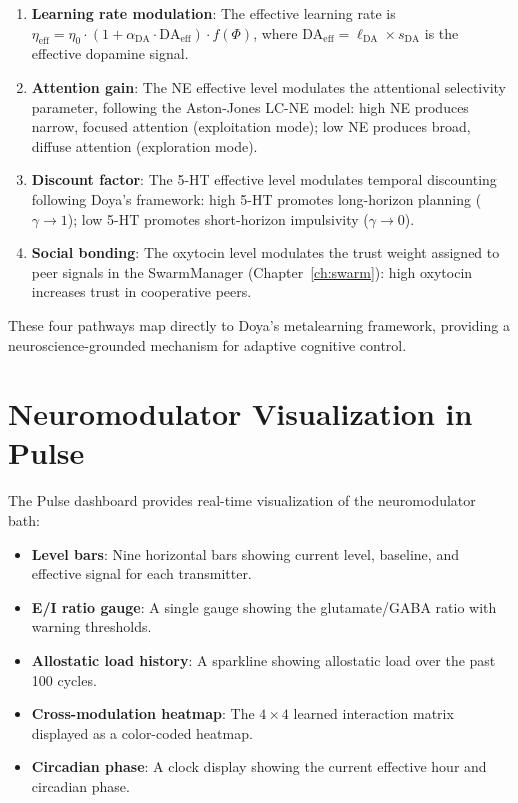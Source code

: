 \documentclass[12pt]{book}
\begin{document}
\begin{enumerate}
  \item \textbf{Learning rate modulation}: The effective learning rate is $\eta_{\text{eff}} = \eta_0 \cdot (1 + \alpha_{\text{DA}} \cdot \text{DA}_{\text{eff}}) \cdot f(\Phi)$, where $\text{DA}_{\text{eff}} = \ell_{\text{DA}} \times s_{\text{DA}}$ is the effective dopamine signal.
  \item \textbf{Attention gain}: The NE effective level modulates the attentional selectivity parameter, following the Aston-Jones LC-NE model: high NE produces narrow, focused attention (exploitation mode); low NE produces broad, diffuse attention (exploration mode).
  \item \textbf{Discount factor}: The 5-HT effective level modulates temporal discounting following Doya's framework: high 5-HT promotes long-horizon planning ($\gamma \to 1$); low 5-HT promotes short-horizon impulsivity ($\gamma \to 0$).
  \item \textbf{Social bonding}: The oxytocin level modulates the trust weight assigned to peer signals in the SwarmManager (Chapter~\ref{ch:swarm}): high oxytocin increases trust in cooperative peers.
\end{enumerate}

These four pathways map directly to Doya's metalearning framework, providing a neuroscience-grounded mechanism for adaptive cognitive control.

\section{Neuromodulator Visualization in Pulse}

The Pulse dashboard provides real-time visualization of the neuromodulator bath:

\begin{itemize}
  \item \textbf{Level bars}: Nine horizontal bars showing current level, baseline, and effective signal for each transmitter.
  \item \textbf{E/I ratio gauge}: A single gauge showing the glutamate/GABA ratio with warning thresholds.
  \item \textbf{Allostatic load history}: A sparkline showing allostatic load over the past 100 cycles.
  \item \textbf{Cross-modulation heatmap}: The $4 \times 4$ learned interaction matrix displayed as a color-coded heatmap.
  \item \textbf{Circadian phase}: A clock display showing the current effective hour and circadian phase.
\end{itemize}
\end{document}
